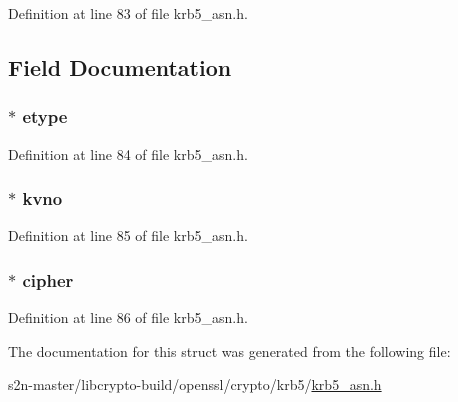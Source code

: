 Definition at line 83 of file krb5\+\_\+asn.\+h.



\subsection{Field Documentation}
\subsubsection[{\texorpdfstring{etype}{etype}}]{ $\ast$ etype}\hypertarget{structkrb5__encdata__st_aa0ea3aeaf8a055ae706b6e1b04c01090}{}\label{structkrb5__encdata__st_aa0ea3aeaf8a055ae706b6e1b04c01090}


Definition at line 84 of file krb5\+\_\+asn.\+h.

\subsubsection[{\texorpdfstring{kvno}{kvno}}]{ $\ast$ kvno}\hypertarget{structkrb5__encdata__st_a9720d744a912d1dd4824965ecb0c1d7f}{}\label{structkrb5__encdata__st_a9720d744a912d1dd4824965ecb0c1d7f}


Definition at line 85 of file krb5\+\_\+asn.\+h.

\subsubsection[{\texorpdfstring{cipher}{cipher}}]{ $\ast$ cipher}\hypertarget{structkrb5__encdata__st_a424a5bfa2d8b18fef58fcf4ae7c56a28}{}\label{structkrb5__encdata__st_a424a5bfa2d8b18fef58fcf4ae7c56a28}


Definition at line 86 of file krb5\+\_\+asn.\+h.



The documentation for this struct was generated from the following file\+:\begin{DoxyCompactItemize}
\item 
s2n-\/master/libcrypto-\/build/openssl/crypto/krb5/\hyperlink{crypto_2krb5_2krb5__asn_8h}{krb5\+\_\+asn.\+h}\end{DoxyCompactItemize}
